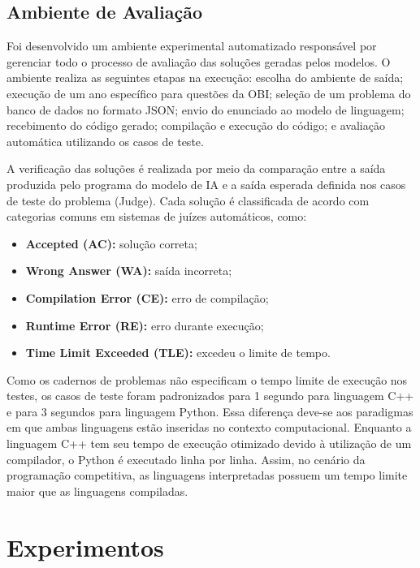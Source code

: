 \documentclass[12pt]{article}
\begin{document}
\subsection{Ambiente de Avaliação}

Foi desenvolvido um ambiente experimental automatizado responsável por gerenciar todo o processo de avaliação das soluções geradas \cite{obibenchmarking2026} pelos modelos. O ambiente realiza as seguintes etapas na execução: escolha do ambiente de saída; execução de um ano específico para questões da OBI; seleção de um problema do banco de dados no formato JSON; envio do enunciado ao modelo de linguagem; recebimento do código gerado; compilação e execução do código; e avaliação automática utilizando os casos de teste.

A verificação das soluções é realizada por meio da comparação entre a saída produzida pelo programa do modelo de IA e a saída esperada definida nos casos de teste do problema (Judge). Cada solução é classificada de acordo com categorias comuns em sistemas de juízes automáticos, como:

\begin{itemize}
    \item \textbf{Accepted (AC):} solução correta;
    \item \textbf{Wrong Answer (WA):} saída incorreta;
    \item \textbf{Compilation Error (CE):} erro de compilação;
    \item \textbf{Runtime Error (RE):} erro durante execução;
    \item \textbf{Time Limit Exceeded (TLE):} excedeu o limite de tempo.
\end{itemize}

Como os cadernos de problemas não especificam o tempo limite de execução nos testes, os casos de teste foram padronizados para 1 segundo para linguagem C++ e para 3 segundos para linguagem Python. Essa diferença deve-se aos paradigmas em que ambas linguagens estão inseridas no contexto computacional. Enquanto a linguagem C++ tem seu tempo de execução otimizado devido à utilização de um compilador, o Python é executado linha por linha. Assim, no cenário da programação competitiva, as linguagens interpretadas possuem um tempo limite maior que as linguagens compiladas.

\section{Experimentos}
\end{document}
